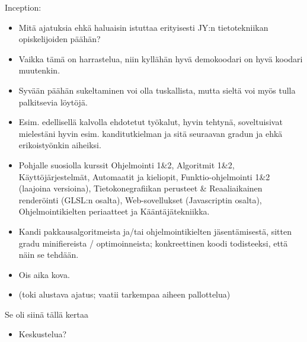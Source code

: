 \documentclass[pdf,10pt,handout]{beamer}
\begin{document}
\begin{frame}{Inception:}
  \begin{itemize}
    \item Mitä ajatuksia ehkä haluaisin istuttaa erityisesti JY:n
      tietotekniikan opiskelijoiden päähän?
    \item Vaikka tämä on harrastelua, niin kyllähän hyvä demokoodari
      on hyvä koodari muutenkin.
    \item Syvään päähän sukeltaminen voi olla tuskallista, mutta
      sieltä voi myös tulla palkitsevia löytöjä.
    \item Esim. edellisellä kalvolla ehdotetut työkalut, hyvin tehtynä,
      soveltuisivat mielestäni hyvin esim. kanditutkielman ja sitä
      seuraavan gradun ja ehkä erikoistyönkin aiheiksi.
    \item Pohjalle suosiolla kurssit Ohjelmointi 1\&2, Algoritmit
      1\&2, Käyttöjärjestelmät, Automaatit ja kieliopit,
      Funktio-ohjelmointi 1\&2 (laajoina versioina),
      Tietokonegrafiikan perusteet \& Reaaliaikainen renderöinti
      (GLSL:n osalta), Web-sovellukset (Javascriptin osalta),
      Ohjelmointikielten periaatteet ja Kääntäjätekniikka.
    \item Kandi pakkausalgoritmeista ja/tai ohjelmointikielten
      jäsentämisestä, sitten gradu minifiereista / optimoinneista;
      konkreettinen koodi todisteeksi, että näin se tehdään.
    \item[] Ois aika kova.
    \item[] (toki alustava ajatus; vaatii tarkempaa aiheen
      pallottelua)
  \end{itemize}
\end{frame}

\begin{frame}{Se oli siinä tällä kertaa}
  \begin{itemize}
    \item Keskustelua?
  \end{itemize}
\end{frame}
\end{document}
